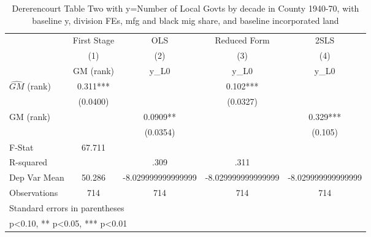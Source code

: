 \begin{table}[htbp]\centering
\def\sym#1{\ifmmode^{#1}\else\(^{#1}\)\fi}
\caption{Dererencourt Table Two with y=Number of Local Govts by decade in County 1940-70, with baseline y, division FEs, mfg and black mig share, and baseline incorporated land}
\begin{tabular}{l*{4}{c}}
\toprule
                    & First Stage   &         OLS   &Reduced Form   &        2SLS   \\
                    &\multicolumn{1}{c}{(1)}&\multicolumn{1}{c}{(2)}&\multicolumn{1}{c}{(3)}&\multicolumn{1}{c}{(4)}\\
                    &\multicolumn{1}{c}{GM  (rank)}&\multicolumn{1}{c}{y\_L0}&\multicolumn{1}{c}{y\_L0}&\multicolumn{1}{c}{y\_L0}\\
\midrule
$\hat{GM}$ (rank)   &       0.311***&               &       0.102***&               \\
                    &    (0.0400)   &               &    (0.0327)   &               \\
\addlinespace
GM  (rank)          &               &      0.0909** &               &       0.329***\\
                    &               &    (0.0354)   &               &     (0.105)   \\
\midrule
F-Stat              &      67.711   &               &               &               \\
R-squared           &               &        .309   &        .311   &               \\
Dep Var Mean        &      50.286   &-8.029999999999999   &-8.029999999999999   &-8.029999999999999   \\
Observations        &         714   &         714   &         714   &         714   \\
\bottomrule
\multicolumn{5}{l}{\footnotesize Standard errors in parentheses}\\
\multicolumn{5}{l}{\footnotesize * p<0.10, ** p<0.05, *** p<0.01}\\
\end{tabular}
\end{table}

